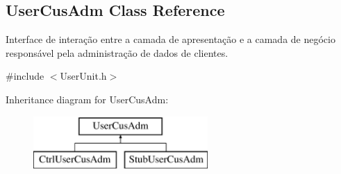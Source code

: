 \hypertarget{classUserCusAdm}{\subsection{User\-Cus\-Adm Class Reference}
\label{d1/d48/classUserCusAdm}
}


Interface de interação entre a camada de apresentação e a camada de negócio responsável pela administração de dados de clientes.  




{\ttfamily \#include $<$User\-Unit.\-h$>$}

Inheritance diagram for User\-Cus\-Adm\-:\begin{figure}[H]
\begin{center}
\leavevmode
\includegraphics[height=2.000000cm]{d1/d48/classUserCusAdm}
\end{center}
\end{figure}

